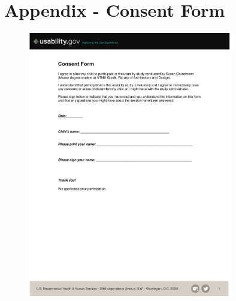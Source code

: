 \chapter{Appendix - Consent Form}








\begin{figure}[!ht]
\centering
\includegraphics[width=0.8\textwidth]{figures/consentformminor.pdf}
\end{figure}


